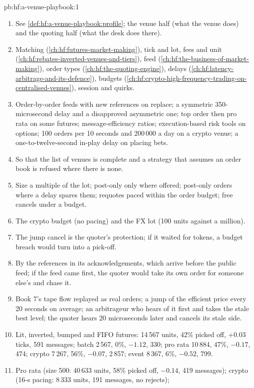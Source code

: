 \begin{solution}{pb:hf:a-venue-playbook:1}
\begin{enumerate}
\item See \cref{def:hf:a-venue-playbook:profile}; the venue half (what the venue does) and the quoting half (what the desk does there).
\item Matching (\cref{ch:hf:futures-market-making}), tick and lot, fees and unit (\cref{ch:hf:rebates-inverted-venues-and-tiers}), feed
(\cref{ch:hf:the-business-of-market-making}), order types (\cref{ch:hf:the-quoting-engine}), delays (\cref{ch:hf:latency-arbitrage-and-its-defence}),
budgets (\cref{ch:hf:crypto-high-frequency-trading-on-centralised-venues}), session and quirks.
\item Order-by-order feeds with new references on replace; a symmetric 350-microsecond delay and a disapproved asymmetric one; top order then pro
rata on some futures; message-efficiency ratios; execution-based risk tools on options; 100 orders per 10 seconds and 200\,000 a day on a crypto
venue; a one-to-twelve-second in-play delay on placing bets.
\item So that the list of venues is complete and a strategy that assumes an order book is refused where there is none.
\item Size a multiple of the lot; post-only only where offered; post-only orders where a delay spares them; requotes paced within the order budget;
free cancels under a budget.
\item The crypto budget (no pacing) and the FX lot (100 units against a million).
\item The jump cancel is the quoter's protection; if it waited for tokens, a budget breach would turn into a pick-off.
\item By the references in its acknowledgements, which arrive before the public feed; if the feed came first, the quoter would take its own order for
someone else's and chase it.
\item Book 7's tape flow replayed as real orders; a jump of the efficient price every 20 seconds on average; an arbitrageur who hears of it first
and takes the stale best level; the quoter hears 20 microseconds later and cancels its stale side.
\item Lit, inverted, bumped and FIFO futures: 14\,567 units, 42\% picked off, $+0.03$ ticks, 591 messages; batch 2\,567, 0\%, $-1.12$, 330; pro rata
10\,884, 47\%, $-0.17$, 474; crypto 7\,267, 56\%, $-0.07$, 2\,857; event 8\,367, 6\%, $-0.52$, 799.
\item Pro rata (size 500: 40\,633 units, 58\% picked off, $-0.14$, 419 messages); crypto (16-s pacing: 8\,333 units, 191 messages, no rejects);

\end{enumerate}
\end{solution}
